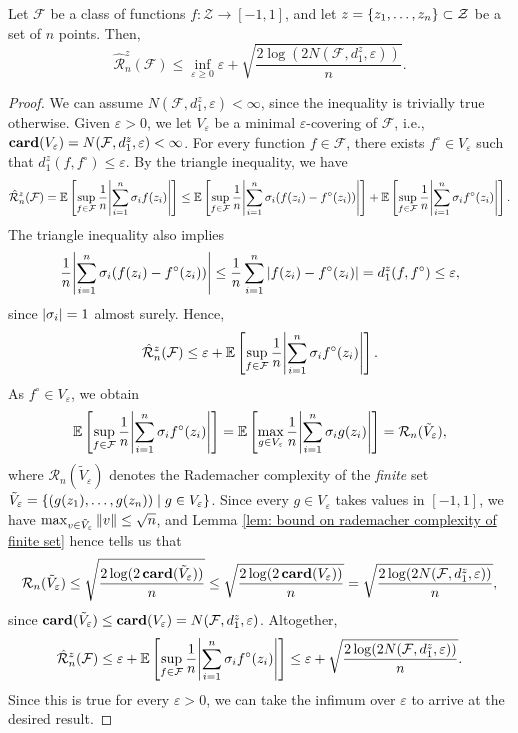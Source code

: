 \begin{theorem}
\label{thm: bound on conditional rademacher average}
Let $\mathcal{F}$ be a class of functions $f \colon \mathcal{Z} \to [-1, 1]$, and let $z = \left\{z_1, \dots, z_n\right\} \subset \mathcal{Z}$ be a set of $n$ points. Then,
\[
    \hat{\mathcal{R}}_n^z(\mathcal{F}) \leq \inf_{\varepsilon \geq 0} \varepsilon + \sqrt{\frac{2 \log(2 N(\mathcal{F}, d_1^z, \varepsilon))}{n}}.
\]
\end{theorem}

\begin{proof}
We can assume $N(\mathcal{F}, d_1^z, \varepsilon) < \infty$, since the inequality is trivially true otherwise. Given $\varepsilon > 0$, we let $V_{\varepsilon}$ be a minimal $\varepsilon$-covering of $\mathcal{F}$, i.e., $\mathrm{\mathbf{card}}(V_{\varepsilon}) = N(\mathcal{F}, d_1^z, \varepsilon) < \infty$. For every function $f \in \mathcal{F}$, there exists $f^{\circ} \in V_{\varepsilon}$ such that $d_1^z(f, f^{\circ}) \leq \varepsilon$. By the triangle inequality, we have
\[
    \hat{\mathcal{R}}_n^z(\mathcal{F}) = \mathbb{E}\left[ \sup_{f \in \mathcal{F}} \frac{1}{n} \abs{\sum_{i=1}^n \sigma_i f(z_i)} \right] \leq \mathbb{E}\left[ \sup_{f \in \mathcal{F}} \frac{1}{n} \abs{\sum_{i=1}^n \sigma_i ( f(z_i) - f^{\circ}(z_i))} \right] + \mathbb{E}\left[ \sup_{f \in \mathcal{F}} \frac{1}{n} \abs{\sum_{i=1}^n \sigma_i f^{\circ}(z_i)} \right].
\]
The triangle inequality also implies
\[
    \frac{1}{n} \abs{\sum_{i=1}^n \sigma_i ( f(z_i) - f^{\circ}(z_i))} \leq \frac{1}{n} \sum_{i=1}^n \abs{ f(z_i) - f^{\circ}(z_i) } = d_1^z(f, f^{\circ}) \leq \varepsilon,
\]
since $\abs{\sigma_i} = 1$ almost surely. Hence,
\[
    \hat{\mathcal{R}}_n^z(\mathcal{F}) \leq \varepsilon + \mathbb{E}\left[ \sup_{f \in \mathcal{F}} \frac{1}{n} \abs{\sum_{i=1}^n \sigma_i f^{\circ}(z_i)} \right].
\]
As $f^{\circ} \in V_{\varepsilon}$, we obtain
\[
    \mathbb{E}\left[ \sup_{f \in \mathcal{F}} \frac{1}{n} \abs{\sum_{i=1}^n \sigma_i f^{\circ}(z_i)} \right] = \mathbb{E}\left[ \max_{g \in V_{\varepsilon}} \frac{1}{n} \abs{\sum_{i=1}^n \sigma_i g(z_i)} \right] = \mathcal{R}_n(\tilde V_{\varepsilon}),
\]
where $\mathcal{R}_n(\tilde V_{\varepsilon})$ denotes the Rademacher complexity of the \emph{finite} set $\tilde V_{\varepsilon} = \left\{ (g(z_1), \dots, g(z_n)) \mathrel{|} g \in V_{\varepsilon} \right\}$. Since every $g \in V_{\varepsilon}$ takes values in $[-1, 1]$, we have $\max_{v \in \tilde V_{\varepsilon}} \norm{v} \leq \sqrt{n}$, and Lemma \ref{lem: bound on rademacher complexity of finite set} hence tells us that
\[
    \mathcal{R}_n(\tilde V_{\varepsilon}) \leq \sqrt{ \frac{2 \, \mathrm{log}(2 \, \mathrm{\mathbf{card}}(\tilde V_{\varepsilon}))}{n} } \leq \sqrt{ \frac{2 \, \mathrm{log}(2 \, \mathrm{\mathbf{card}}(V_{\varepsilon}))}{n} } = \sqrt{ \frac{2 \, \mathrm{log}(2 N(\mathcal{F}, d_1^z, \varepsilon))}{n} },
\]
since $\mathrm{\mathbf{card}}(\tilde V_{\varepsilon}) \leq \mathrm{\mathbf{card}}(V_{\varepsilon}) = N(\mathcal{F}, d_1^z, \varepsilon)$. Altogether,
\[
    \hat{\mathcal{R}}_n^z(\mathcal{F}) \leq \varepsilon + \mathbb{E}\left[ \sup_{f \in \mathcal{F}} \frac{1}{n} \abs{\sum_{i=1}^n \sigma_i f^{\circ}(z_i)} \right] \leq \varepsilon + \sqrt{ \frac{2 \, \mathrm{log}(2 N(\mathcal{F}, d_1^z, \varepsilon))}{n} }.
\]
Since this is true for every $\varepsilon > 0$, we can take the infimum over $\varepsilon$ to arrive at the desired result.
\end{proof}

